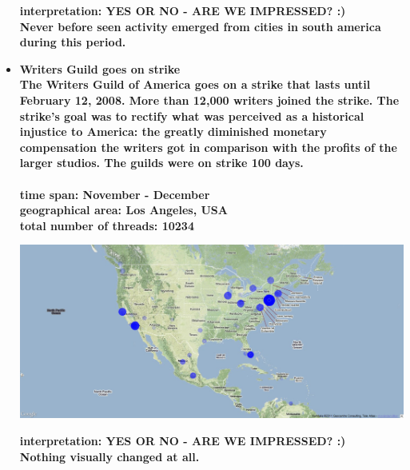 \documentclass[11pt,a4paper,english]{article}
\begin{document}
\begin{itemize}
						\bf interpretation: \rm YES OR NO - ARE WE IMPRESSED? :)
						\\ Never before seen activity emerged from cities in south america during this period.
						
						
						
					\item \bf Writers Guild goes on strike \rm
						\\ The Writers Guild of America goes on a strike that lasts until February 12, 2008. More than 12,000 writers joined the strike. The strike's goal was to rectify what was perceived as a historical injustice to America: the greatly diminished monetary compensation the writers got in comparison with the profits of the larger studios. The guilds were on strike 100 days.
						\\\\ \bf time span: \rm November - December
						\\ \bf geographical area: \rm Los Angeles, USA
						\\ \bf total number of threads: \rm 10234
					
						\includegraphics[width=130mm]{img/post-writer}
						
						\bf interpretation: \rm YES OR NO - ARE WE IMPRESSED? :)
						\\ Nothing visually changed at all.
						
						
						
				\end{itemize}
			
\end{document}
